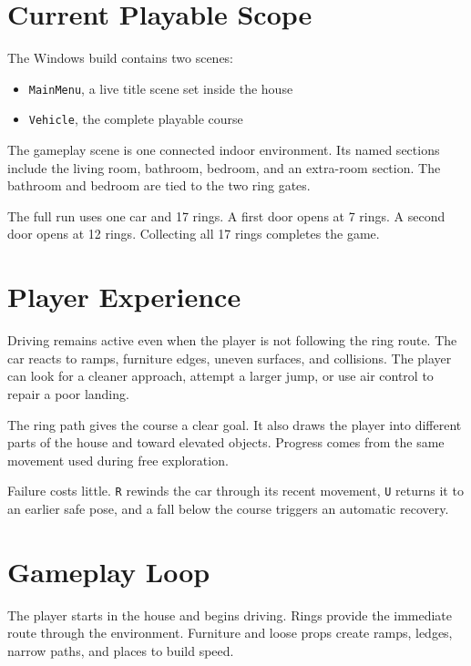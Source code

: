 \documentclass[11pt,a4paper]{article}
\begin{document}
\section{Current Playable Scope}\label{current-playable-scope}

The Windows build contains two scenes:

\begin{itemize}
\item
  \texttt{MainMenu}, a live title scene set inside the house
\item
  \texttt{Vehicle}, the complete playable course
\end{itemize}

The gameplay scene is one connected indoor environment. Its named sections include the living room, bathroom, bedroom, and an extra-room section. The bathroom and bedroom are tied to the two ring gates.

The full run uses one car and 17 rings. A first door opens at 7 rings. A second door opens at 12 rings. Collecting all 17 rings completes the game.

\section{Player Experience}\label{player-experience}

Driving remains active even when the player is not following the ring route. The car reacts to ramps, furniture edges, uneven surfaces, and collisions. The player can look for a cleaner approach, attempt a larger jump, or use air control to repair a poor landing.

The ring path gives the course a clear goal. It also draws the player into different parts of the house and toward elevated objects. Progress comes from the same movement used during free exploration.

Failure costs little. \texttt{R} rewinds the car through its recent movement, \texttt{U} returns it to an earlier safe pose, and a fall below the course triggers an automatic recovery.

\section{Gameplay Loop}\label{gameplay-loop}

The player starts in the house and begins driving. Rings provide the immediate route through the environment. Furniture and loose props create ramps, ledges, narrow paths, and places to build speed.
\end{document}
